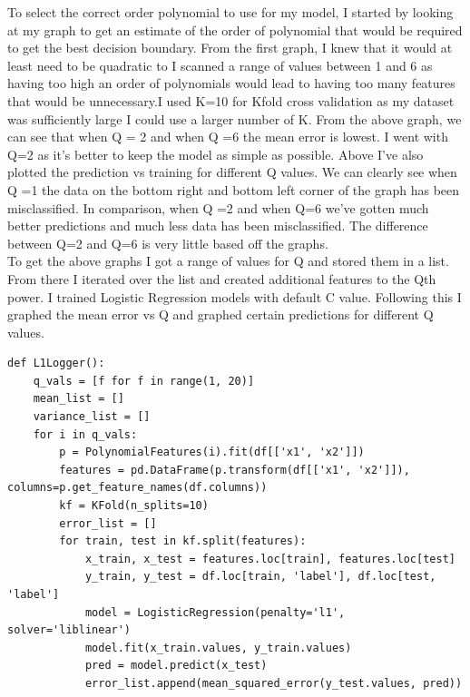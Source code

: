 \documentclass[11pt]{article} %
\begin{document}
To select the correct order polynomial to use for my model, I started by looking at my graph to get an estimate of the order of polynomial that would be required to get the best decision boundary. From the first graph, I knew that it would at least need to be quadratic to I scanned a range of values between 1 and 6 as having too high an order of polynomials would lead to having too many features that would be unnecessary.I used K=10 for Kfold cross validation as my dataset was sufficiently large I could use a larger number of K. From the above graph, we can see that when Q = 2 and when Q =6 the mean error is lowest. I went with Q=2 as it's better to keep the model as simple as possible. Above I've also plotted the prediction vs training for different Q values. We can clearly see when Q =1 the data on the bottom right and bottom left corner of the graph has been misclassified. In comparison, when Q =2 and when Q=6 we've gotten much better predictions and much less data has been misclassified. The difference between Q=2 and Q=6 is very little based off the graphs.  \\ To get the above graphs I got a range of values for Q and stored them in a list. From there I iterated over the list and created additional features to the Qth power. I trained Logistic Regression models with default C value. Following this I graphed the mean error vs Q and graphed certain predictions for different Q values. 
\begin{verbatim}
def L1Logger():
    q_vals = [f for f in range(1, 20)]
    mean_list = []
    variance_list = []
    for i in q_vals:
        p = PolynomialFeatures(i).fit(df[['x1', 'x2']])
        features = pd.DataFrame(p.transform(df[['x1', 'x2']]), columns=p.get_feature_names(df.columns))
        kf = KFold(n_splits=10)
        error_list = []
        for train, test in kf.split(features):
            x_train, x_test = features.loc[train], features.loc[test]
            y_train, y_test = df.loc[train, 'label'], df.loc[test, 'label']
            model = LogisticRegression(penalty='l1', solver='liblinear')
            model.fit(x_train.values, y_train.values)
            pred = model.predict(x_test)
            error_list.append(mean_squared_error(y_test.values, pred))
\end{verbatim}
\newpage
\end{document}
